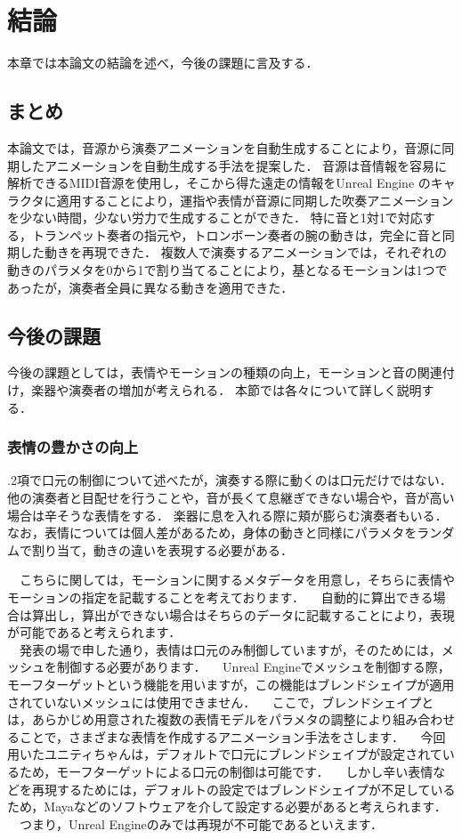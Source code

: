 \chapter{結論}
\label{chap:conclusion}
本章では本論文の結論を述べ，今後の課題に言及する．

\section{まとめ}
本論文では，音源から演奏アニメーションを自動生成することにより，音源に同期したアニメーションを自動生成する手法を提案した．
音源は音情報を容易に解析できるMIDI音源を使用し，そこから得た遠走の情報をUnreal Engine のキャラクタに適用することにより，運指や表情が音源に同期した吹奏アニメーションを少ない時間，少ない労力で生成することができた．
特に音と1対1で対応する，トランペット奏者の指元や，トロンボーン奏者の腕の動きは，完全に音と同期した動きを再現できた．
複数人で演奏するアニメーションでは，それぞれの動きのパラメタを0から1で割り当てることにより，基となるモーションは1つであったが，演奏者全員に異なる動きを適用できた．

\section{今後の課題}
今後の課題としては，表情やモーションの種類の向上，モーションと音の関連付け，楽器や演奏者の増加が考えられる．
本節では各々について詳しく説明する．

\subsection{表情の豊かさの向上}
{.2項}で口元の制御について述べたが，演奏する際に動くのは口元だけではない．
他の演奏者と目配せを行うことや，音が長くて息継ぎできない場合や，音が高い場合は辛そうな表情をする．
楽器に息を入れる際に頬が膨らむ演奏者もいる．
なお，表情については個人差があるため，身体の動きと同様にパラメタをランダムで割り当て，動きの違いを表現する必要がある．

　こちらに関しては，モーションに関するメタデータを用意し，そちらに表情やモーションの指定を記載することを考えております．
　自動的に算出できる場合は算出し，算出ができない場合はそちらのデータに記載することにより，表現が可能であると考えられます．\\
　発表の場で申した通り，表情は口元のみ制御していますが，そのためには，メッシュを制御する必要があります．
　Unreal Engineでメッシュを制御する際，モーフターゲットという機能を用いますが，この機能はブレンドシェイプが適用されていないメッシュには使用できません．
　ここで，ブレンドシェイプとは，あらかじめ用意された複数の表情モデルをパラメタの調整により組み合わせることで，さまざまな表情を作成するアニメーション手法をさします．
　今回用いたユニティちゃんは，デフォルトで口元にブレンドシェイプが設定されているため，モーフターゲットによる口元の制御は可能です．
　しかし辛い表情などを再現するためには，デフォルトの設定ではブレンドシェイプが不足しているため，Mayaなどのソフトウェアを介して設定する必要があると考えられます．
　つまり，Unreal Engineのみでは再現が不可能であるといえます．\\

